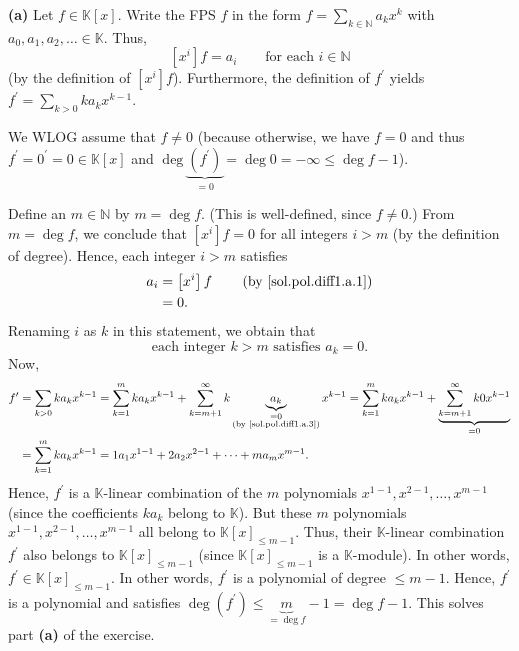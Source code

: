\documentclass[paper=a4, fontsize=12pt]{scrartcl}%
\let\sumnonlimits\sum
\renewcommand{\sum}{\sumnonlimits\limits}
\theoremstyle{plainsl}
\theoremstyle{definition}
\theoremstyle{remark}
\begin{document}
\bigskip

\textbf{(a)} Let $f\in\mathbb{K}\left[  x\right]  $. Write the FPS $f$ in the
form $f=\sum_{k\in\mathbb{N}}a_{k}x^{k}$ with $a_{0},a_{1},a_{2},\ldots
\in\mathbb{K}$. Thus,%
\begin{equation}
\left[  x^{i}\right]  f=a_{i}\qquad\text{for each }i\in\mathbb{N}
\label{sol.pol.diff1.a.1}%
\end{equation}
(by the definition of $\left[  x^{i}\right]  f$). Furthermore, the definition
of $f^{\prime}$ yields $f^{\prime}=\sum_{k>0}ka_{k}x^{k-1}$.

We WLOG assume that $f\neq0$ (because otherwise, we have $f=0$ and thus
$f^{\prime}=0^{\prime}=0\in\mathbb{K}\left[  x\right]  $ and $\deg
\underbrace{\left(  f^{\prime}\right)  }_{=0}=\deg0=-\infty\leq\deg f-1$).

Define an $m\in\mathbb{N}$ by $m=\deg f$. (This is well-defined, since
$f\neq0$.) From $m=\deg f$, we conclude that $\left[  x^{i}\right]  f=0$ for
all integers $i>m$ (by the definition of degree). Hence, each integer $i>m$
satisfies%
\begin{align}
a_{i}  &  =\left[  x^{i}\right]  f\qquad\left(  \text{by
\eqref{sol.pol.diff1.a.1}}\right) \nonumber\\
&  =0. \label{sol.pol.diff1.a.2}%
\end{align}
Renaming $i$ as $k$ in this statement, we obtain that%
\begin{equation}
\text{each integer }k>m\text{ satisfies }a_{k}=0\text{.}
\label{sol.pol.diff1.a.3}%
\end{equation}
Now,%
\begin{align*}
f^{\prime}  &  =\sum_{k>0}ka_{k}x^{k-1}=\sum_{k=1}^{m}ka_{k}x^{k-1}%
+\sum_{k=m+1}^{\infty}k\underbrace{a_{k}}_{\substack{=0\\\text{(by
\eqref{sol.pol.diff1.a.3})}}}x^{k-1}=\sum_{k=1}^{m}ka_{k}x^{k-1}%
+\underbrace{\sum_{k=m+1}^{\infty}k0x^{k-1}}_{=0}\\
&  =\sum_{k=1}^{m}ka_{k}x^{k-1}=1a_{1}x^{1-1}+2a_{2}x^{2-1}+\cdots
+ma_{m}x^{m-1}.
\end{align*}
Hence, $f^{\prime}$ is a $\mathbb{K}$-linear combination of the $m$
polynomials $x^{1-1},x^{2-1},\ldots,x^{m-1}$ (since the coefficients $ka_{k}$
belong to $\mathbb{K}$). But these $m$ polynomials $x^{1-1},x^{2-1}%
,\ldots,x^{m-1}$ all belong to $\mathbb{K}\left[  x\right]  _{\leq m-1}$.
Thus, their $\mathbb{K}$-linear combination $f^{\prime}$ also belongs to
$\mathbb{K}\left[  x\right]  _{\leq m-1}$ (since $\mathbb{K}\left[  x\right]
_{\leq m-1}$ is a $\mathbb{K}$-module). In other words, $f^{\prime}%
\in\mathbb{K}\left[  x\right]  _{\leq m-1}$. In other words, $f^{\prime}$ is a
polynomial of degree $\leq m-1$. Hence, $f^{\prime}$ is a polynomial and
satisfies $\deg\left(  f^{\prime}\right)  \leq\underbrace{m}_{=\deg f}-1=\deg
f-1$. This solves part \textbf{(a)} of the exercise.
\end{document}
